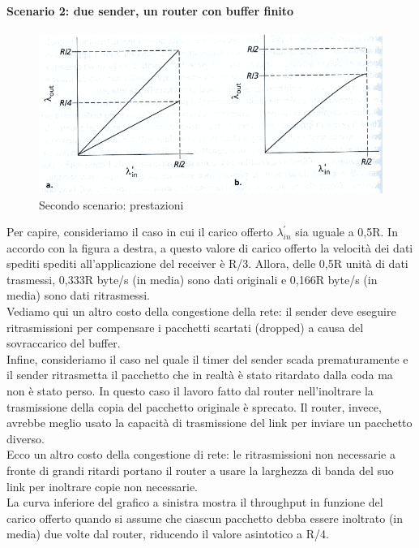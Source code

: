 \documentclass[11pt,a4paper]{article}
\begin{document}
\paragraph{Scenario 2: due sender, un router con buffer finito}
\begin{figure}
	\includegraphics[scale=0.6]{img/042.png}
	\caption{Secondo scenario: prestazioni}
\end{figure}
Per capire, consideriamo il caso in cui il carico offerto $\lambda_{in}^{'}$ sia uguale a 0,5R. In accordo con la figura a destra, a questo valore di carico offerto la velocità dei dati spediti spediti all'applicazione del receiver è R/3. Allora, delle 0,5R unità di dati trasmessi, 0,333R byte/s (in media) sono dati originali e 0,166R byte/s (in media) sono dati ritrasmessi. \\
Vediamo qui un altro costo della congestione della rete: il sender deve eseguire ritrasmissioni per compensare i pacchetti scartati (dropped) a causa del sovraccarico del buffer. \\
Infine, consideriamo il caso nel quale il timer del sender scada prematuramente e il sender ritrasmetta il pacchetto che in realtà è stato ritardato dalla coda ma non è stato perso. In questo caso il lavoro fatto dal router nell'inoltrare la trasmissione della copia del pacchetto originale è sprecato. Il router, invece, avrebbe meglio usato la capacità di trasmissione del link per inviare un pacchetto diverso. \\
Ecco un altro costo della congestione di rete: le ritrasmissioni non necessarie a fronte di grandi ritardi portano il router a usare la larghezza di banda del suo link per inoltrare copie non necessarie. \\
La curva inferiore del grafico a sinistra mostra il throughput in funzione  del carico offerto quando si assume che ciascun pacchetto debba essere inoltrato (in media) due volte dal router, riducendo il valore asintotico a R/4.
\end{document}
